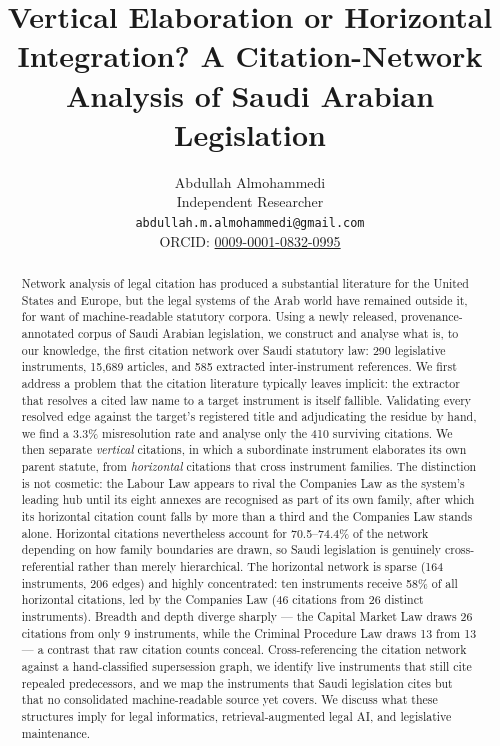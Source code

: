\documentclass[sn-basic]{sn-jnl}%
\title{Vertical Elaboration or Horizontal Integration? A Citation-Network
Analysis of Saudi Arabian Legislation}
\author*[1]{\fnm{Abdullah} \sur{Almohammedi}}\email{abdullah.m.almohammedi@gmail.com}
\affil[1]{\orgname{Independent Researcher}}
\author{Abdullah Almohammedi \\
    Independent Researcher \\
    \texttt{abdullah.m.almohammedi@gmail.com} \\
    ORCID: \href{https://orcid.org/0009-0001-0832-0995}{0009-0001-0832-0995}}
\date{}
\begin{document}
\maketitle

\begin{abstract}
Network analysis of legal citation has produced a substantial literature for
the United States and Europe, but the legal systems of the Arab world have
remained outside it, for want of machine-readable statutory corpora. Using a
newly released, provenance-annotated corpus of Saudi Arabian legislation, we
construct and analyse what is, to our knowledge, the first citation
network over Saudi statutory law:
290 legislative instruments, 15{,}689 articles, and 585 extracted
inter-instrument references. We first address a problem that the citation
literature typically leaves implicit: the extractor that resolves a cited law
name to a target instrument is itself fallible. Validating every resolved
edge against the target's registered title and adjudicating the residue by
hand, we find a 3.3\% misresolution rate and analyse only the 410 surviving
citations. We then separate \emph{vertical} citations, in which a subordinate
instrument elaborates its own parent statute, from \emph{horizontal}
citations that cross instrument families. The distinction is not cosmetic:
the Labour Law appears to rival the Companies Law as the system's leading hub
until its eight annexes are recognised as part of its own family, after which
its horizontal citation count falls by more than a third and the Companies
Law stands alone. Horizontal citations nevertheless account for 70.5--74.4\%
of the network depending on how family boundaries are drawn, so Saudi
legislation is genuinely cross-referential rather than merely hierarchical.
The horizontal network is sparse (164 instruments, 206 edges) and highly
concentrated: ten instruments receive 58\% of all horizontal citations, led
by the Companies Law (46 citations from 26 distinct instruments). Breadth and
depth diverge sharply --- the Capital Market Law draws 26 citations from only
9 instruments, while the Criminal Procedure Law draws 13 from 13 --- a
contrast that raw citation counts conceal. Cross-referencing the citation
network against a hand-classified supersession graph, we identify live
instruments that still cite repealed predecessors, and we map the instruments
that Saudi legislation cites but that no consolidated machine-readable source
yet covers. We discuss what these structures imply for legal informatics,
retrieval-augmented legal AI, and legislative maintenance.
\end{abstract}
\end{document}
